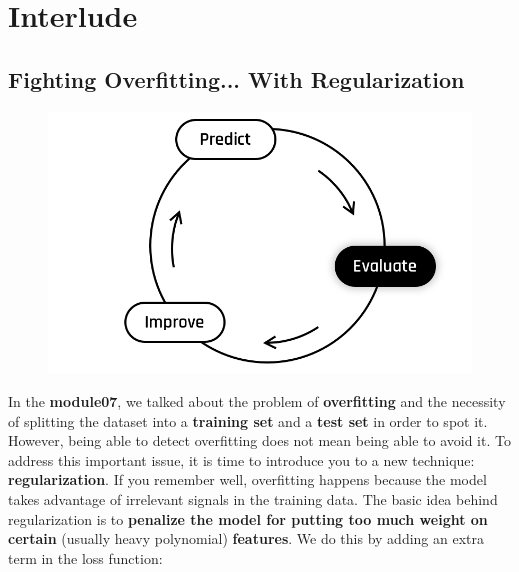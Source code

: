 
\section*{Interlude}
\subsection*{Fighting Overfitting... With Regularization}

\begin{figure}[!h]
    \centering
    \includegraphics[scale=0.25]{assets/Evaluate.png}
\end{figure}

In the \textbf{module07}, we talked about the problem of \textbf{overfitting} and the necessity of splitting the dataset into a \textbf{training set} and a \textbf{test set} in order to spot it.
However, being able to detect overfitting does not mean being able to avoid it.
To address this important issue, it is time to introduce you to a new technique: \textbf{regularization}.
If you remember well, overfitting happens because the model takes advantage of irrelevant signals in the training data.
The basic idea behind regularization is to \textbf{penalize the model for putting too much weight on certain} (usually heavy polynomial) \textbf{features}.
We do this by adding an extra term in the loss function:

